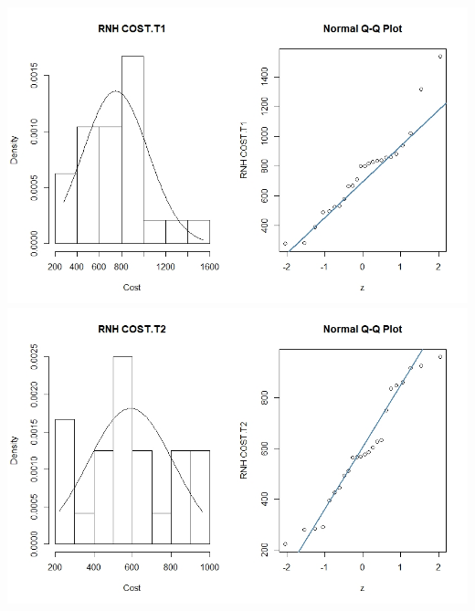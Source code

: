 \documentclass[11pt]{article}
\begin{document}
\includegraphics[width=15cm]{RStudio/jpeg/Norm RNH T1.jpeg}
\includegraphics[width=15cm]{RStudio/jpeg/Norm RNH T2.jpeg}
\end{document}

